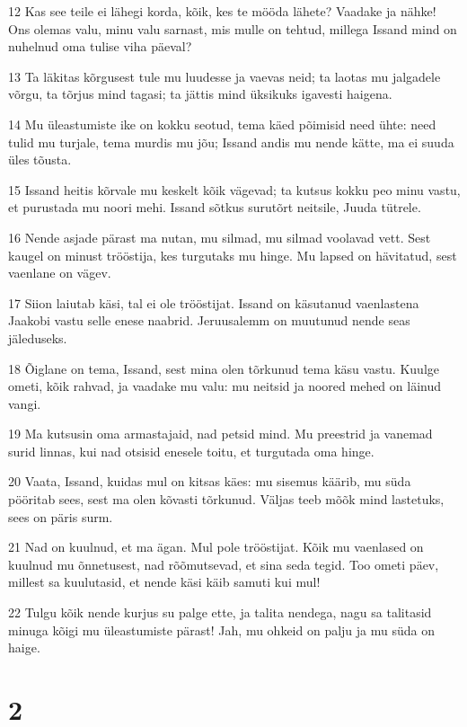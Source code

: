 \par 12 Kas see teile ei lähegi korda, kõik, kes te mööda lähete? Vaadake ja nähke! Ons olemas valu, minu valu sarnast, mis mulle on tehtud, millega Issand mind on nuhelnud oma tulise viha päeval?
\par 13 Ta läkitas kõrgusest tule mu luudesse ja vaevas neid; ta laotas mu jalgadele võrgu, ta tõrjus mind tagasi; ta jättis mind üksikuks igavesti haigena.
\par 14 Mu üleastumiste ike on kokku seotud, tema käed põimisid need ühte: need tulid mu turjale, tema murdis mu jõu; Issand andis mu nende kätte, ma ei suuda üles tõusta.
\par 15 Issand heitis kõrvale mu keskelt kõik vägevad; ta kutsus kokku peo minu vastu, et purustada mu noori mehi. Issand sõtkus surutõrt neitsile, Juuda tütrele.
\par 16 Nende asjade pärast ma nutan, mu silmad, mu silmad voolavad vett. Sest kaugel on minust trööstija, kes turgutaks mu hinge. Mu lapsed on hävitatud, sest vaenlane on vägev.
\par 17 Siion laiutab käsi, tal ei ole trööstijat. Issand on käsutanud vaenlastena Jaakobi vastu selle enese naabrid. Jeruusalemm on muutunud nende seas jäleduseks.
\par 18 Õiglane on tema, Issand, sest mina olen tõrkunud tema käsu vastu. Kuulge ometi, kõik rahvad, ja vaadake mu valu: mu neitsid ja noored mehed on läinud vangi.
\par 19 Ma kutsusin oma armastajaid, nad petsid mind. Mu preestrid ja vanemad surid linnas, kui nad otsisid enesele toitu, et turgutada oma hinge.
\par 20 Vaata, Issand, kuidas mul on kitsas käes: mu sisemus käärib, mu süda pööritab sees, sest ma olen kõvasti tõrkunud. Väljas teeb mõõk mind lastetuks, sees on päris surm.
\par 21 Nad on kuulnud, et ma ägan. Mul pole trööstijat. Kõik mu vaenlased on kuulnud mu õnnetusest, nad rõõmutsevad, et sina seda tegid. Too ometi päev, millest sa kuulutasid, et nende käsi käib samuti kui mul!
\par 22 Tulgu kõik nende kurjus su palge ette, ja talita nendega, nagu sa talitasid minuga kõigi mu üleastumiste pärast! Jah, mu ohkeid on palju ja mu süda on haige.

\chapter{2}

